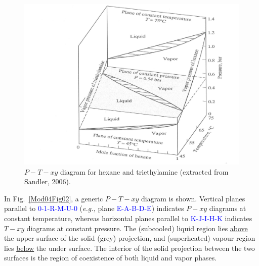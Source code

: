 \documentclass[12pts,a4paper,amsmath,amssymb,floatfix]{article}%
\newcommand{\blue}{\textcolor{blue}}
\newcommand{\eg}{{\it e.g., }}
\begin{document}
      \begin{figure}[h]
         \begin{center}
           \includegraphics[width=.9\columnwidth,clip]{./../Pics/PTxy_diagram}
           \vspace{-.1cm}\caption{$P-T-xy$ diagram for hexane and triethylamine (extracted from Sandler, 2006).}\label{Mod04Fig01}
         \end{center}
       \end{figure}

In Fig.~\ref{Mod04Fig02}, a generic $P-T-xy$ diagram is shown. Vertical planes parallel to \blue{0-1-R-M-U-0} (\eg plane \blue{E-A-B-D-E}) indicates $P-xy$ diagrams at constant temperature, whereas horizontal planes parallel to \blue{K-J-I-H-K} indicates $T-xy$ diagrams at constant pressure. The (subcooled) liquid region lies \underline{above} the upper surface of the solid (grey) projection, and (superheated) vapour region lies \underline{below} the under surface. The interior of the solid projection between the two surfaces is the region of coexistence of both liquid and vapor phases. 
\end{document}
